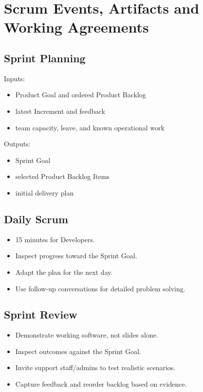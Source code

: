 \section{Scrum Events, Artifacts and Working Agreements}

\subsection{Sprint Planning}

Inputs:

\begin{itemize}
\item Product Goal and ordered Product Backlog
\item latest Increment and feedback
\item team capacity, leave, and known operational work
\end{itemize}
Outputs:

\begin{itemize}
\item Sprint Goal
\item selected Product Backlog Items
\item initial delivery plan
\end{itemize}
\subsection{Daily Scrum}

\begin{itemize}
\item 15 minutes for Developers.
\item Inspect progress toward the Sprint Goal.
\item Adapt the plan for the next day.
\item Use follow-up conversations for detailed problem solving.
\end{itemize}
\subsection{Sprint Review}

\begin{itemize}
\item Demonstrate working software, not slides alone.
\item Inspect outcomes against the Sprint Goal.
\item Invite support staff/admins to test realistic scenarios.
\item Capture feedback and reorder backlog based on evidence.
\end{itemize}
